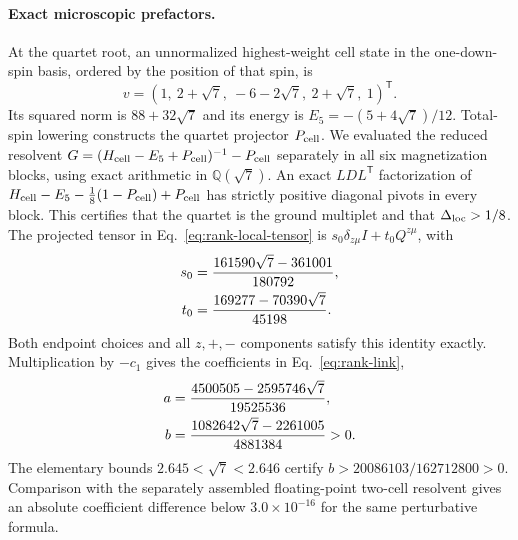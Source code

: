 \paragraph*{Exact microscopic prefactors.}
At the quartet root, an unnormalized highest-weight cell state in the
one-down-spin basis, ordered by the position of that spin, is
\begin{equation}
 v=(1,\ 2+\sqrt7,\ -6-2\sqrt7,\ 2+\sqrt7,\ 1)^{\mathsf T}.
\end{equation}
Its squared norm is $88+32\sqrt7$ and its energy is
$E_5=-(5+4\sqrt7)/12$. Total-spin lowering constructs the quartet
projector $P_{\rm cell}$. We evaluated the reduced resolvent
$G=(H_{\rm cell}-E_5+P_{\rm cell})^{-1}-P_{\rm cell}$ separately in all
six magnetization blocks, using exact arithmetic in $\mathbb Q(\sqrt7)$.
An exact $LDL^{\mathsf T}$ factorization of
$H_{\rm cell}-E_5-\tfrac18(1-P_{\rm cell})+P_{\rm cell}$
has strictly positive diagonal pivots in every block. This certifies
that the quartet is the ground multiplet and that $\Delta_{\mathrm{loc}}>1/8$.
The projected tensor in Eq.~\eqref{eq:rank-local-tensor} is
$s_0\delta_{z\mu}I+t_0Q^{z\mu}$, with
\begin{align}
 s_0&=\frac{161590\sqrt7-361001}{180792},\notag\\
 t_0&=\frac{169277-70390\sqrt7}{45198}.
\end{align}
Both endpoint choices and all $z,+,-$ components satisfy this identity
exactly. Multiplication by $-c_1$ gives the coefficients in
Eq.~\eqref{eq:rank-link},
\begin{align}
 a&=\frac{4500505-2595746\sqrt7}{19525536},\notag\\
 b&=\frac{1082642\sqrt7-2261005}{4881384}>0.
 \label{eq:exact-local-coefficients}
\end{align}
The elementary bounds
$2.645<\sqrt7<2.646$ certify $b>20086103/162712800>0$.
Comparison with the separately assembled floating-point two-cell
resolvent gives an absolute coefficient difference below
$3.0\times10^{-16}$ for the same perturbative formula.

